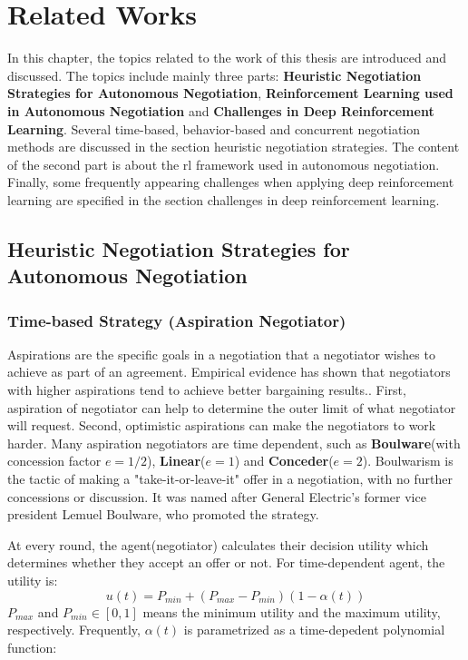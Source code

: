 \chapter{Related Works}
In this chapter, the topics related to the work of this thesis are introduced and discussed. The topics include mainly three parts: \textbf{Heuristic Negotiation Strategies for Autonomous Negotiation}, \textbf{Reinforcement Learning used in Autonomous Negotiation} and \textbf{Challenges in Deep Reinforcement Learning}. Several time-based, behavior-based and concurrent negotiation methods are discussed in the section heuristic negotiation strategies. The content of the second part is about the \gls{rl} framework used in autonomous negotiation. Finally, some frequently appearing challenges when applying deep reinforcement learning are specified in the section challenges in deep reinforcement learning.

\section{Heuristic Negotiation Strategies for Autonomous Negotiation} \label{related-work:heuristic-negotiation}
\subsection{Time-based Strategy (Aspiration Negotiator)}
Aspirations are the specific goals in a negotiation that a negotiator wishes to achieve as part of an agreement. Empirical evidence has shown that negotiators with higher aspirations tend to achieve better bargaining results.. First, aspiration of negotiator can help to determine the outer limit of what negotiator will request. Second, optimistic aspirations can make the negotiators to work harder\parencite{Schneider2004}. Many aspiration negotiators are time dependent, such as \textbf{Boulware}(with concession factor $e=1/2$), \textbf{Linear}($e=1$) and \textbf{Conceder}($e=2$)\parencite{FARATIN1998159}. Boulwarism is the tactic of making a "take-it-or-leave-it" offer in a negotiation, with no further concessions or discussion. It was named after General Electric's former vice president Lemuel Boulware, who promoted the strategy\parencite{William1991}.

At every round, the agent(negotiator) calculates their decision utility which determines whether they accept an offer or not. For time-dependent agent, the utility is:
\begin{equation}
u(t) = P_{min} + (P_{max} - P_{min})(1-\alpha(t))
\end{equation}
$P_{max}$ and $P_{min} \in [0, 1]$ means the minimum utility and the maximum utility, respectively. Frequently, $\alpha(t)$ is parametrized as a time-depedent polynomial function: 

